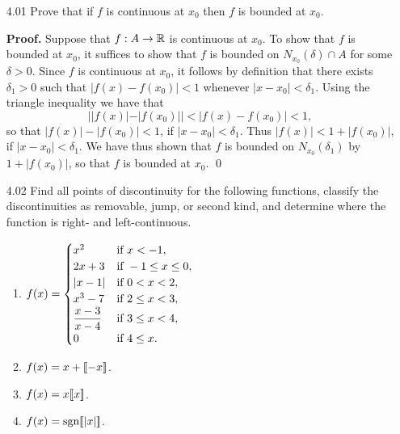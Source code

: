 \begin{enumerate}
   \item[4.01] Prove that if $f$ is continuous at $x_0$ then $f$ is bounded at
               $x_0$.

      \textbf{Proof.} Suppose that $f : A \rightarrow \mathbb{R}$ is continuous at
      $x_0$. To show that $f$ is bounded at $x_0$, it suffices to show that
      $f$ is bounded on $N_{x_0}(\delta) \cap A$ for some $\delta > 0$. Since
      $f$ is continuous at $x_0$, it follows by definition that there exists
      $\delta_1 > 0$ such that $|f(x) - f(x_0)| < 1$ whenever
      $|x - x_0| < \delta_1$. Using the triangle inequality we have that
      $$||f(x)| - |f(x_0)|| < |f(x) - f(x_0)| < 1,$$
      so that $|f(x)| - |f(x_0)| < 1$, if $|x - x_0| < \delta_1$. Thus
      $|f(x)| < 1 + |f(x_0)|$, if $|x - x_0| < \delta_1$. We have thus shown
      that $f$ is bounded on $N_{x_0}(\delta_1)$ by $1 + |f(x_0)|$, so that
      $f$ is bounded at $x_0$. \qed
   \item[4.02] Find all points of discontinuity for the following functions,
               classify the discontinuities as removable, jump, or second kind,
               and determine where the function is right- and left-continuous.
               \begin{enumerate}
                  \item $f(x) = \begin{cases}
                           x^2                 & \text{if } x < -1, \\
                           2x + 3              & \text{if } -1 \le x \le 0,\\
                           |x - 1|             & \text{if } 0 < x < 2, \\
                           x^3 - 7             & \text{if } 2 \le x < 3, \\
                         \displaystyle\frac{x - 3}{x - 4} & \text{if } 3 \le x < 4, \\
                           0                   & \text{if } 4 \le x.
                        \end{cases}$
                  \item $f(x) = x + \lbrack\!\lbrack -x \rbrack\!\rbrack$.
                  \item $f(x) = x \lbrack\!\lbrack x \rbrack\!\rbrack$.
                  \item $f(x) = \text{sgn}\lbrack\!\lbrack |x| \rbrack\!\rbrack$.

\end{enumerate}
\end{enumerate}
